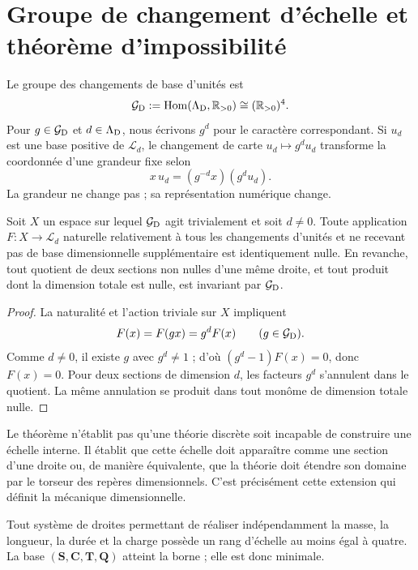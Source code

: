 \section{Groupe de changement d'échelle et théorème d'impossibilité}

Le groupe des changements de base d'unités est
\[
 \mathcal G_{\rm D}
 :=\operatorname{Hom}(\Lambda_{\rm D},\mathbb R_{>0})
 \cong(\mathbb R_{>0})^4.
\]
Pour \(g\in\mathcal G_{\rm D}\) et \(d\in\Lambda_{\rm D}\), nous écrivons
\(g^d\) pour le caractère correspondant. Si \(u_d\) est une base positive
de \(\mathcal L_d\), le changement de carte
\(u_d\mapsto g^d u_d\) transforme la coordonnée d'une grandeur fixe selon
\[
 x\,u_d=(g^{-d}x)(g^du_d).
\]
La grandeur ne change pas ; sa représentation numérique change.

\begin{theorem}
\label{thm:no-go-dimensional-rango-cuatro}
Soit \(X\) un espace sur lequel \(\mathcal G_{\rm D}\) agit
trivialement et soit \(d\ne0\). Toute application
\(F:X\to\mathcal L_d\) naturelle relativement à tous les changements
d'unités et ne recevant pas de base dimensionnelle supplémentaire est identiquement
nulle. En revanche, tout quotient de deux sections non nulles d'une même droite,
et tout produit dont la dimension totale est nulle, est invariant par
\(\mathcal G_{\rm D}\).
\end{theorem}

\begin{proof}
La naturalité et l'action triviale sur \(X\) impliquent
\[
 F(x)=F(gx)=g^dF(x)
 \qquad(g\in\mathcal G_{\rm D}).
\]
Comme \(d\ne0\), il existe \(g\) avec \(g^d\ne1\) ; d'où
\((g^d-1)F(x)=0\), donc \(F(x)=0\). Pour deux sections de dimension
\(d\), les facteurs \(g^d\) s'annulent dans le quotient. La même annulation
se produit dans tout monôme de dimension totale nulle.
\end{proof}

Le théorème n'établit pas qu'une théorie discrète soit incapable de construire une
échelle interne. Il établit que cette échelle doit apparaître comme une section d'une
droite ou, de manière équivalente, que la théorie doit étendre son domaine par le
torseur des repères dimensionnels. C'est précisément cette extension qui définit
la mécanique dimensionnelle.

\begin{corollary}
Tout système de droites permettant de réaliser indépendamment la masse,
la longueur, la durée et la charge possède un rang d'échelle au moins égal à quatre. La base
\((\mathbf S,\mathbf C,\mathbf T,\mathbf Q)\) atteint la borne ; elle est donc
minimale.
\end{corollary}

